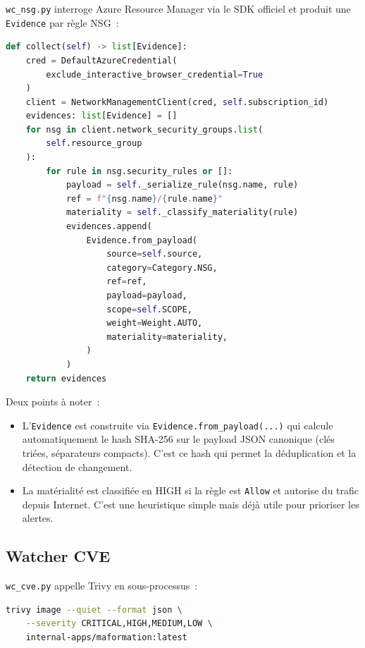 \texttt{wc\_nsg.py} interroge Azure Resource Manager via le SDK
officiel et produit une \texttt{Evidence} par règle NSG~:

\begin{lstlisting}[language=Python,caption={Cœur du watcher NSG.}]
def collect(self) -> list[Evidence]:
    cred = DefaultAzureCredential(
        exclude_interactive_browser_credential=True
    )
    client = NetworkManagementClient(cred, self.subscription_id)
    evidences: list[Evidence] = []
    for nsg in client.network_security_groups.list(
        self.resource_group
    ):
        for rule in nsg.security_rules or []:
            payload = self._serialize_rule(nsg.name, rule)
            ref = f"{nsg.name}/{rule.name}"
            materiality = self._classify_materiality(rule)
            evidences.append(
                Evidence.from_payload(
                    source=self.source,
                    category=Category.NSG,
                    ref=ref,
                    payload=payload,
                    scope=self.SCOPE,
                    weight=Weight.AUTO,
                    materiality=materiality,
                )
            )
    return evidences
\end{lstlisting}

Deux points à noter~:

\begin{itemize}
  \item L'\texttt{Evidence} est construite via
    \texttt{Evidence.from\_payload(...)} qui calcule
    automatiquement le hash SHA-256 sur le payload JSON
    canonique (clés triées, séparateurs compacts). C'est ce hash
    qui permet la déduplication et la détection de changement.
  \item La matérialité est classifiée en HIGH si la règle est
    \texttt{Allow} et autorise du trafic depuis Internet. C'est
    une heuristique simple mais déjà utile pour prioriser les
    alertes.
\end{itemize}

\subsection{Watcher CVE}

\texttt{wc\_cve.py} appelle Trivy en sous-processus~:

\begin{lstlisting}[language=bash]
trivy image --quiet --format json \
    --severity CRITICAL,HIGH,MEDIUM,LOW \
    internal-apps/maformation:latest
\end{lstlisting}

